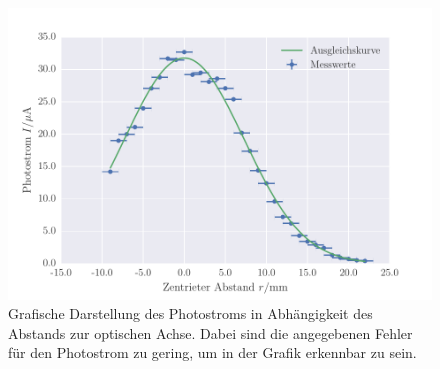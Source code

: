 \begin{figure}[!h]
 \centering
 \includegraphics[scale=0.75]{../Grafiken/TEM_00.pdf}
 \caption{Grafische Darstellung des Photostroms in Abhängigkeit des Abstands zur optischen Achse. Dabei sind die angegebenen Fehler
 	für den Photostrom zu gering, um in der Grafik erkennbar zu sein.\label{fig:tem_00}}
 \end{figure} 